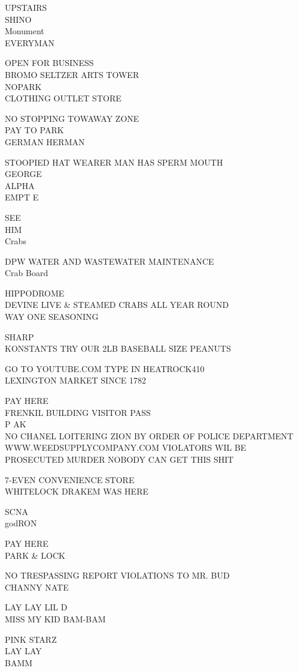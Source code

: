 \documentclass[10pt,letterpaper]{article}
\begin{document}
UPSTAIRS\\
SHINO\\
Monument\\
EVERYMAN

OPEN FOR BUSINESS\\
BROMO SELTZER ARTS TOWER\\
NOPARK\\
CLOTHING OUTLET STORE

NO STOPPING TOWAWAY ZONE\\
PAY TO PARK\\
GERMAN HERMAN

STOOPIED HAT WEARER MAN HAS SPERM MOUTH\\
GEORGE\\
ALPHA\\
EMPT E

SEE\\
HIM\\
Crabs

DPW WATER AND WASTEWATER MAINTENANCE\\
Crab Board

HIPPODROME\\
DEVINE LIVE \& STEAMED CRABS ALL YEAR ROUND\\
WAY ONE SEASONING

SHARP\\
KONSTANTS TRY OUR 2LB BASEBALL SIZE PEANUTS

GO TO YOUTUBE.COM TYPE IN HEATROCK410\\
LEXINGTON MARKET SINCE 1782

PAY HERE\\
FRENKIL BUILDING VISITOR PASS\\
P AK\\
NO CHANEL LOITERING ZION BY ORDER OF POLICE DEPARTMENT WWW.WEEDSUPPLYCOMPANY.COM VIOLATORS WIL BE PROSECUTED MURDER NOBODY CAN GET THIS SHIT

7{-}EVEN CONVENIENCE STORE\\
WHITELOCK DRAKEM WAS HERE

SCNA\\
godRON

PAY HERE\\
PARK \& LOCK

NO TRESPASSING REPORT VIOLATIONS TO MR. BUD\\
CHANNY NATE

LAY LAY LIL D\\
MISS MY KID BAM{-}BAM

PINK STARZ\\
LAY LAY\\
BAMM
\end{document}
